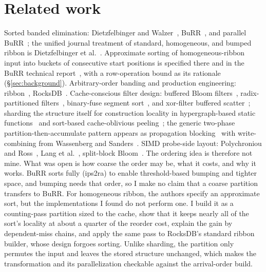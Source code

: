 \documentclass[a4paper,UKenglish,cleveref,autoref,thm-restate,anonymous]{lipics-v2021}
\begin{document}
\section{Related work}\label{sec:related}
Sorted banded elimination: Dietzfelbinger and Walzer~\cite{dietzfelbinger2019gauss}, BuRR~\cite{dillinger2022burr}, and parallel BuRR~\cite{becht2024parallelburr}; the unified journal treatment of standard, homogeneous, and bumped ribbon is Dietzfelbinger et al.~\cite{dietzfelbinger2026ribbon}. Approximate sorting of homogeneous-ribbon input into buckets of consecutive start positions is specified there and in the BuRR technical report~\cite{dillinger2021burrtr}, with a row-operation bound as its rationale (\S\ref{sec:background}). Arbitrary-order banding and production engineering: ribbon~\cite{dillinger2021ribbon}, RocksDB~\cite{rocksdbribbonblog}. Cache-conscious filter design: buffered Bloom filters~\cite{canim2010buffered}, radix-partitioned filters~\cite{schmidt2021partitioned}, binary-fuse segment sort~\cite{graf2022binaryfuse}, and xor-filter buffered scatter~\cite{graf2020xor}; sharding the structure itself for construction locality in hypergraph-based static functions~\cite{genuzio2016fast,vigna2025sharding} and sort-based cache-oblivious peeling~\cite{belazzougui2013peeling}; the generic two-phase partition-then-accumulate pattern appears as propagation blocking~\cite{beamer2017propagation} with write-combining from Wassenberg and Sanders~\cite{wassenberg2011radix}. SIMD probe-side layout: Polychroniou and Ross~\cite{polychroniou2014vectorized}, Lang et al.~\cite{lang2019performance}, split-block Bloom~\cite{apache2021sbbf}. The ordering idea is therefore not mine. What was open is how coarse the order may be, what it costs, and why it works. BuRR sorts fully (ips2ra) to enable threshold-based bumping and tighter space, and bumping needs that order, so I make no claim that a coarse partition transfers to BuRR. For homogeneous ribbon, the authors specify an approximate sort, but the implementations I found do not perform one. I build it as a counting-pass partition sized to the cache, show that it keeps nearly all of the sort's locality at about a quarter of the reorder cost, explain the gain by dependent-miss chains, and apply the same pass to RocksDB's standard ribbon builder, whose design forgoes sorting. Unlike sharding, the partition only permutes the input and leaves the stored structure unchanged, which makes the transformation and its parallelization checkable against the arrival-order build.
\end{document}
